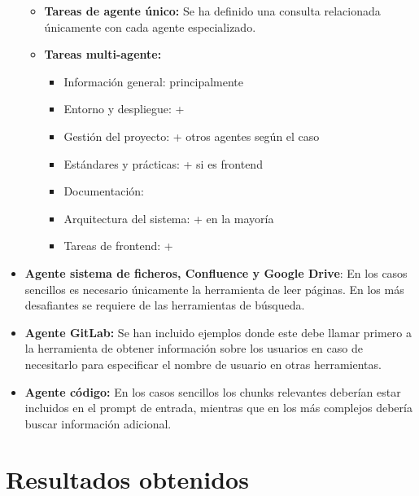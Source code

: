 \begin{itemize}
\begin{itemize}
    \item \textbf{Tareas de agente único: }Se ha definido una consulta relacionada únicamente con cada agente especializado. 
    \item \textbf{Tareas multi-agente:}
    \begin{itemize}
        \item Información general:  principalmente
        \item Entorno y despliegue:  + 
        \item Gestión del proyecto:  + otros agentes según el caso
        \item Estándares y prácticas:  +  si es frontend
        \item Documentación: 
        \item Arquitectura del sistema:  +  en la mayoría
        \item Tareas de frontend:  + 
    \end{itemize}
  \end{itemize}
\item\textbf{Agente sistema de ficheros, Confluence y Google Drive}: En los casos sencillos es necesario únicamente la herramienta de leer páginas. En los más desafiantes se requiere de las herramientas de búsqueda.
\item\textbf{Agente GitLab: }Se han incluido ejemplos donde este debe llamar primero a la herramienta de obtener información sobre los usuarios en caso de necesitarlo para especificar el nombre de usuario en otras herramientas.
\item\textbf{Agente código: }En los casos sencillos los chunks relevantes deberían estar incluidos en el prompt de entrada, mientras que en los más complejos debería buscar información adicional. 
\end{itemize}
\section{Resultados obtenidos}

\clearpage

